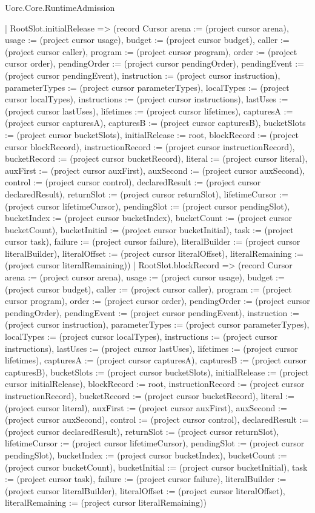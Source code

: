 \begin{lexlean}{Uorc.Core.RuntimeAdmission}
\begin{semanticmodule}
{    | RootSlot.initialRelease => (record Cursor {arena := (project cursor arena), usage := (project cursor usage), budget := (project cursor budget), caller := (project cursor caller), program := (project cursor program), order := (project cursor order), pendingOrder := (project cursor pendingOrder), pendingEvent := (project cursor pendingEvent), instruction := (project cursor instruction), parameterTypes := (project cursor parameterTypes), localTypes := (project cursor localTypes), instructions := (project cursor instructions), lastUses := (project cursor lastUses), lifetimes := (project cursor lifetimes), capturesA := (project cursor capturesA), capturesB := (project cursor capturesB), bucketSlots := (project cursor bucketSlots), initialRelease := root, blockRecord := (project cursor blockRecord), instructionRecord := (project cursor instructionRecord), bucketRecord := (project cursor bucketRecord), literal := (project cursor literal), auxFirst := (project cursor auxFirst), auxSecond := (project cursor auxSecond), control := (project cursor control), declaredResult := (project cursor declaredResult), returnSlot := (project cursor returnSlot), lifetimeCursor := (project cursor lifetimeCursor), pendingSlot := (project cursor pendingSlot), bucketIndex := (project cursor bucketIndex), bucketCount := (project cursor bucketCount), bucketInitial := (project cursor bucketInitial), task := (project cursor task), failure := (project cursor failure), literalBuilder := (project cursor literalBuilder), literalOffset := (project cursor literalOffset), literalRemaining := (project cursor literalRemaining)})
    | RootSlot.blockRecord => (record Cursor {arena := (project cursor arena), usage := (project cursor usage), budget := (project cursor budget), caller := (project cursor caller), program := (project cursor program), order := (project cursor order), pendingOrder := (project cursor pendingOrder), pendingEvent := (project cursor pendingEvent), instruction := (project cursor instruction), parameterTypes := (project cursor parameterTypes), localTypes := (project cursor localTypes), instructions := (project cursor instructions), lastUses := (project cursor lastUses), lifetimes := (project cursor lifetimes), capturesA := (project cursor capturesA), capturesB := (project cursor capturesB), bucketSlots := (project cursor bucketSlots), initialRelease := (project cursor initialRelease), blockRecord := root, instructionRecord := (project cursor instructionRecord), bucketRecord := (project cursor bucketRecord), literal := (project cursor literal), auxFirst := (project cursor auxFirst), auxSecond := (project cursor auxSecond), control := (project cursor control), declaredResult := (project cursor declaredResult), returnSlot := (project cursor returnSlot), lifetimeCursor := (project cursor lifetimeCursor), pendingSlot := (project cursor pendingSlot), bucketIndex := (project cursor bucketIndex), bucketCount := (project cursor bucketCount), bucketInitial := (project cursor bucketInitial), task := (project cursor task), failure := (project cursor failure), literalBuilder := (project cursor literalBuilder), literalOffset := (project cursor literalOffset), literalRemaining := (project cursor literalRemaining)})
}
\end{semanticmodule}
\end{lexlean}
